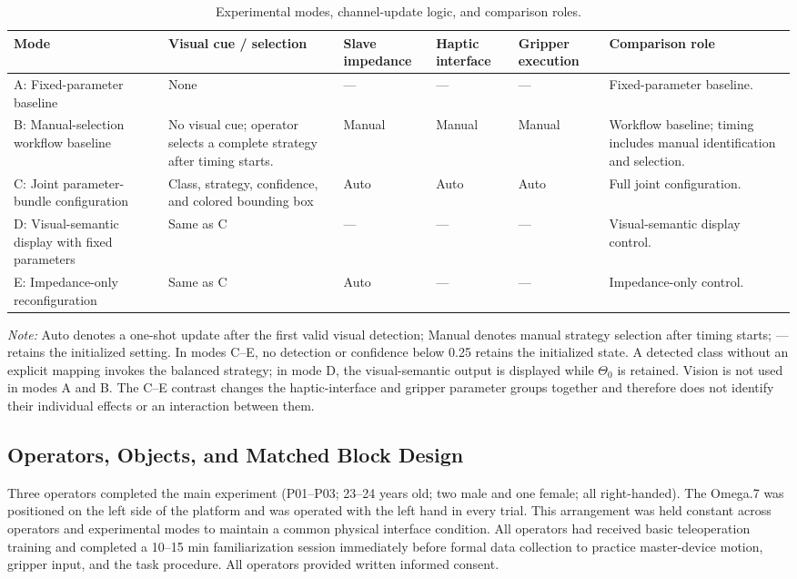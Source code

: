 \begin{table}[!t]
\centering
\caption{Experimental modes, channel-update logic, and comparison roles.}
\label{tab:3}
\scriptsize
\setlength{\tabcolsep}{4pt}
\renewcommand{\arraystretch}{1.20}
\begin{tabularx}{\textwidth}{@{}p{}p{}>{\centering\arraybackslash}p{}>{\centering\arraybackslash}p{}>{\centering\arraybackslash}p{}Y@{}}
\toprule
Mode & Visual cue / selection & Slave impedance & Haptic interface & Gripper execution & Comparison role \\
\midrule
A: Fixed-parameter baseline & None & --- & --- & --- & Fixed-parameter baseline. \\
B: Manual-selection workflow baseline & No visual cue; operator selects a complete strategy after timing starts. & Manual & Manual & Manual & Workflow baseline; timing includes manual identification and selection. \\
C: Joint parameter-bundle configuration & Class, strategy, confidence, and colored bounding box & Auto & Auto & Auto & Full joint configuration. \\
D: Visual-semantic display with fixed parameters & Same as C & --- & --- & --- & Visual-semantic display control. \\
E: Impedance-only reconfiguration & Same as C & Auto & --- & --- & Impedance-only control. \\
\bottomrule
\end{tabularx}
\par\smallskip
\footnotesize\textit{Note:} Auto denotes a one-shot update after the first valid visual detection; Manual denotes manual strategy selection after timing starts; --- retains the initialized setting. In modes C--E, no detection or confidence below 0.25 retains the initialized state. A detected class without an explicit mapping invokes the balanced strategy; in mode D, the visual-semantic output is displayed while $\Theta_0$ is retained. Vision is not used in modes A and B. The C--E contrast changes the haptic-interface and gripper parameter groups together and therefore does not identify their individual effects or an interaction between them.
\end{table}

\subsection{Operators, Objects, and Matched Block Design}
Three operators completed the main experiment (P01--P03; 23--24 years old; two male and one female; all right-handed). The Omega.7 was positioned on the left side of the platform and was operated with the left hand in every trial. This arrangement was held constant across operators and experimental modes to maintain a common physical interface condition. All operators had received basic teleoperation training and completed a 10--15 min familiarization session immediately before formal data collection to practice master-device motion, gripper input, and the task procedure. All operators provided written informed consent.

